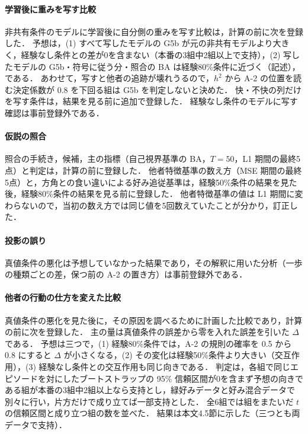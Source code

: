 \paragraph{学習後に重みを写す比較}
非共有条件のモデルに学習後に自分側の重みを写す比較は，計算の前に次を登録した．
予想は，(1) すべて写したモデルの G5b が元の非共有モデルより大きく，経験なし条件との差が0を含まない（本番の3組中2組以上で支持），(2) 写したモデルの G5b・符号に従う分・照合の BA は経験80\%条件に近づく（記述），である．
あわせて，写すと他者の追跡が壊れうるので，$h^2$ から A-2 の位置を読む決定係数が 0.8 を下回る組は G5b を判定しないと決めた．
快・不快の列だけを写す条件は，結果を見る前に追加で登録した．
経験なし条件のモデルに写す確認は事前登録外である．

\paragraph{仮説の照合}
照合の手続き，候補，主の指標（自己視界基準の BA，$T=50$，L1 期間の最終5点）と判定は，計算の前に登録した．
他者特徴基準の数え方（MSE 期間の最終5点）と，方角との食い違いによる好み追従基準は，経験50\%条件の結果を見た後，経験80\%条件の結果を見る前に登録した．
他者特徴基準の値は L1 期間に変わらないので，当初の数え方では同じ値を5回数えていたことが分かり，訂正した．

\paragraph{投影の誤り}
真値条件の悪化は予想していなかった結果であり，その解釈に用いた分析（一歩の種類ごとの差，保つ前の A-2 の置き方）は事前登録外である．

\paragraph{他者の行動の仕方を変えた比較}
真値条件の悪化を見た後に，その原因を調べるために計画した比較であり，計算の前に次を登録した．
主の量は真値条件の誤差から零を入れた誤差を引いた $\Delta$ である．
予想は三つで，(1) 経験80\%条件では，A-2 の規則の確率を 0.5 から 0.8 にすると $\Delta$ が小さくなる，(2) その変化は経験50\%条件より大きい（交互作用），(3) 経験なし条件との交互作用も同じ向きである．
判定は，各組で同じエピソードを対にしたブートストラップの 95\% 信頼区間が0を含まず予想の向きである組が本番の3組中2組以上なら支持とし，緑好みデータと好み混合データで別々に行い，片方だけで成り立てば一部支持とした．
全6組では組をまたいだ $t$ の信頼区間と成り立つ組の数を並べた．
結果は本文4.5節に示した（三つとも両データで支持）．

